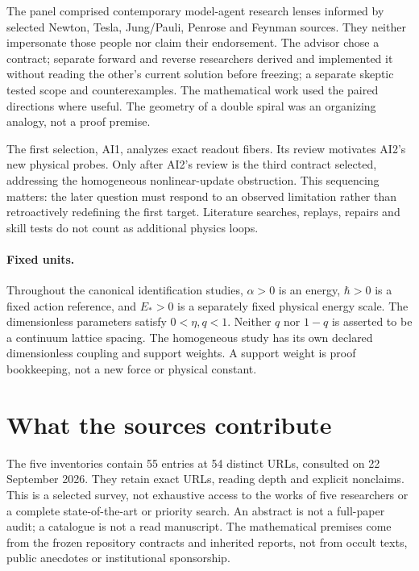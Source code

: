 \documentclass[11pt,a4paper]{article}
\begin{document}
The panel comprised contemporary model-agent research lenses informed by selected Newton, Tesla, Jung/Pauli, Penrose and Feynman sources. They neither impersonate those people nor claim their endorsement. The advisor chose a contract; separate forward and reverse researchers derived and implemented it without reading the other's current solution before freezing; a separate skeptic tested scope and counterexamples. The mathematical work used the paired directions where useful. The geometry of a double spiral was an organizing analogy, not a proof premise.

The first selection, AI1, analyzes exact readout fibers. Its review motivates AI2's new physical probes. Only after AI2's review is the third contract selected, addressing the homogeneous nonlinear-update obstruction. This sequencing matters: the later question must respond to an observed limitation rather than retroactively redefining the first target. Literature searches, replays, repairs and skill tests do not count as additional physics loops.

\paragraph{Fixed units.} Throughout the canonical identification studies, $\alpha>0$ is an energy, $\hbar>0$ is a fixed action reference, and $E_*>0$ is a separately fixed physical energy scale. The dimensionless parameters satisfy $0<\eta,q<1$. Neither $q$ nor $1-q$ is asserted to be a continuum lattice spacing. The homogeneous study has its own declared dimensionless coupling and support weights. A support weight is proof bookkeeping, not a new force or physical constant.

\section{What the sources contribute}
The five inventories contain 55 entries at 54 distinct URLs, consulted on 22 September 2026. They retain exact URLs, reading depth and explicit nonclaims. This is a selected survey, not exhaustive access to the works of five researchers or a complete state-of-the-art or priority search. An abstract is not a full-paper audit; a catalogue is not a read manuscript. The mathematical premises come from the frozen repository contracts and inherited reports, not from occult texts, public anecdotes or institutional sponsorship.
\end{document}
